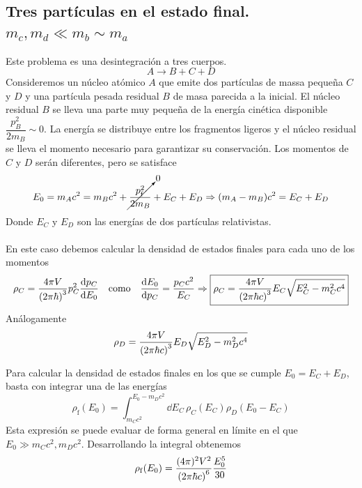 \subsection{Tres partículas en el estado final. $m_c,m_d\ll m_b\sim m_a$}
Este problema es una desintegración a tres cuerpos.
\begin{equation}
    A\longrightarrow B+C+D
\end{equation}
Consideremos un núcleo atómico $A$ que emite dos partículas de massa pequeña $C$ y $D$ y una partícula pesada residual $B$ de masa parecida a la inicial. El núcleo residual $B$ se lleva una parte muy pequeña de la energía cinética disponible $\dfrac{p_B^2}{2m_B}\sim 0$. La energía se distribuye entre los fragmentos ligeros y el núcleo residual se lleva el momento necesario para garantizar su conservación. Los momentos de $C$ y $D$ serán diferentes, pero se satisface
\begin{equation}
    E_0=m_Ac^2=m_Bc^2 +\cancelto{0}{\frac{p_\mathrm{f}^2}{2m_B}}+ E_C+E_D \Rightarrow \qty(m_A-m_B)c^2=E_C+E_D
\end{equation}
Donde $E_C$ y $E_D$ son las energías de dos partículas relativistas.\\\\
En este caso debemos calcular la densidad de estados finales para cada uno de los momentos
\begin{equation}
\rho_C=\frac{4\pi V}{\qty(2\pi\hbar)^3} p_C^2 \dv{p_C}{E_0} \quad \text{como} \quad \dv{E_0}{p_C}=\frac{p_Cc^2}{E_C} \Rightarrow \boxed{\rho_C=\frac{4\pi V}{\qty(2\pi\hbar c)^3}  E_C\sqrt{E_C^2-m_C^2c^4}}
\end{equation}
Análogamente
\begin{equation}
    \rho_D=\frac{4\pi V}{\qty(2\pi\hbar c)^3}  E_D\sqrt{E_D^2-m_D^2c^4}
\end{equation}

Para calcular la densidad de estados finales en los que se cumple $E_0=E_C+E_D$, basta con integrar una de las energías
\begin{equation}
    \rho_\mathrm{f}(E_0)=\int^{E_0-m_Dc^2}_{m_Cc^2} \dd E_C \, \rho_C(E_C) \rho_D(E_0-E_C)
\end{equation}
Esta expresión se puede evaluar de forma general en límite en el que $E_0\gg m_Cc^2,m_Dc^2$. Desarrollando la integral obtenemos 
\begin{equation}
    \rho_\mathrm{f}(E_0)=\frac{(4\pi)^2V^2}{\qty(2\pi \hbar c)^6}\frac{E_0^5}{30}
    \label{eq: espacio fasico desintegracion a tres cuerpos}
\end{equation}
